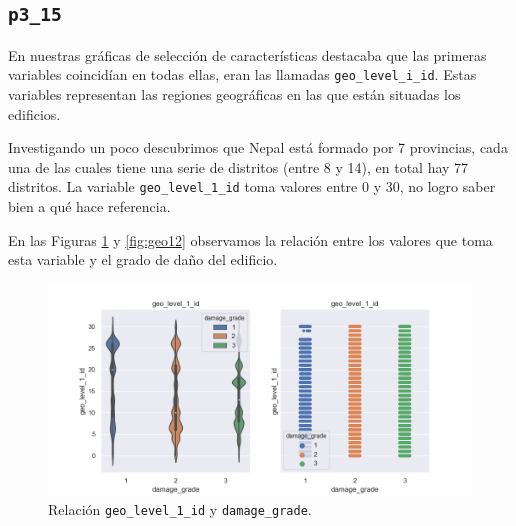 \documentclass[a4paper, 20pt]{article}
\begin{document}
\subsection{\texttt{p3\_15}}

En nuestras gráficas de selección de características destacaba que las primeras variables coincidían en todas ellas, eran las llamadas \texttt{geo\_level\_i\_id}. Estas variables representan las regiones geográficas en las que están situadas los edificios.

Investigando un poco descubrimos que Nepal está formado por 7 provincias, cada una de las cuales tiene una serie de distritos (entre 8 y 14), en total hay 77 distritos. La variable \texttt{geo\_level\_1\_id} toma valores entre 0 y 30, no logro saber bien a qué hace referencia.

En las Figuras \ref{fig:geo11} y \ref{fig:geo12} observamos la relación entre los valores que toma esta variable y el grado de daño del edificio.

\begin{figure}[H]
    \centering
    \includegraphics[height=0.9\textwidth, width=1.0\textwidth]{geo_level_1_1}
    \caption{Relación \texttt{geo\_level\_1\_id} y \texttt{damage\_grade}.}
    \label{fig:geo11}
\end{figure}
\end{document}
